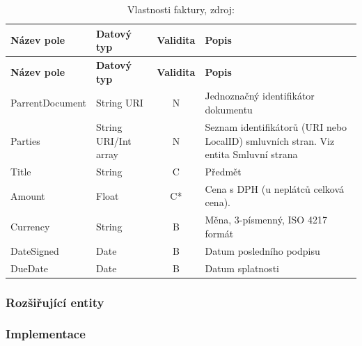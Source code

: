 \begin{center}
\begin{longtable}{lp{20mm}cp{65mm}}
\label{grid_mlmmh} \\
\multicolumn{1}{l}{\textbf{Název pole}} & 
\multicolumn{1}{l}{\textbf{Datový typ}} & 
\multicolumn{1}{l}{\textbf{Validita}} & 
\multicolumn{1}{l}{\textbf{Popis}} \\ \hline 
\endfirsthead
\multicolumn{1}{l}{\textbf{Název pole}} & 
\multicolumn{1}{l}{\textbf{Datový typ}} & 
\multicolumn{1}{l}{\textbf{Validita}} & 
\multicolumn{1}{l}{\textbf{Popis}} \\ \hline 
\hline
\endhead
\endfoot
\caption[Vlastnosti faktury]{Vlastnosti faktury, zdroj:\cite{metodika, standard}}
\endlastfoot
ParrentDocument & String URI & N & Jednoznačný identifikátor dokumentu \\
Parties & String URI/Int array & N & Seznam identifikátorů (URI nebo LocalID) smluvních stran. Viz entita Smluvní strana \\
\rowcolor{validateC}Title & String & C & Předmět \\
\rowcolor{validateC}Amount & Float & C* & Cena s DPH (u neplátců celková cena). \\
\rowcolor{validateB}Currency & String & B & Měna, 3-písmenný, ISO 4217 formát \\
\rowcolor{validateB}DateSigned & Date & B & Datum posledního podpisu \\
\rowcolor{validateB}DueDate & Date & B & Datum splatnosti \\
\end{longtable}
\end{center}

\subsubsection*{Rozšiřující entity}

\subsubsection*{Implementace}

